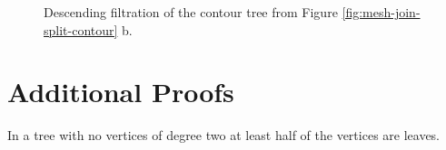 \begin{appendices}
\begin{figure}[h]

    \caption{Descending filtration of the contour tree from Figure \ref{fig:mesh-join-split-contour} b.}%
    \label{fig:desc-filtration-tree}%
\end{figure}

\chapter{Additional Proofs}
\label{chapter-proofs}

\begin{lem} In a tree with no vertices of degree two at least half of the vertices are leaves. \end{lem}


\end{appendices}
